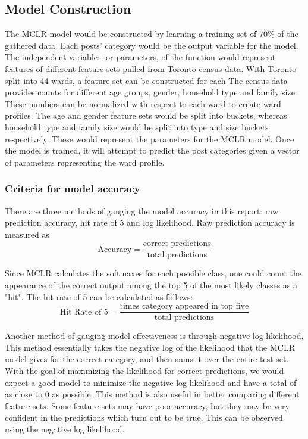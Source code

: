 \documentclass[12pt]{article}
\begin{document}
   \subsection{Model Construction}
   The MCLR model would be constructed by learning a training set of 70\% of the gathered data. Each posts' category would be the output variable for the model. The independent variables, or parameters, of the function would represent features of different feature sets pulled from Toronto census data. With Toronto split into 44 wards, a feature set can be constructed for each  The census data provides counts for different age groups, gender, household type and family size. These numbers can be normalized with respect to each ward to create ward profiles. The age and gender feature sets would be split into buckets, whereas household type and family size would be split into type and size buckets respectively. These would represent the parameters for the MCLR model. Once the model is trained, it will attempt to predict the post categories given a vector of parameters representing the ward profile. 

   \subsubsection{Criteria for model accuracy}
   There are three methods of gauging the model accuracy in this report: raw prediction accuracy, hit rate of 5 and log likelihood. Raw prediction accuracy is measured as 
   \[\text{Accuracy} = \frac{\text{correct predictions}}{\text{total predictions}}\]

   Since MCLR calculates the softmaxes for each possible class, one could count the appearance of the correct output among the top 5 of the most likely classes as a "hit". The hit rate of 5 can be calculated as follows:
   \[\text{Hit Rate of 5} = \frac{\text{times category appeared in top five}}{\text{total predictions}}\]

   Another method of gauging model effectiveness is through negative log likelihood. This method essentially takes the negative log of the likelihood that the MCLR model gives for the correct category, and then sums it over the entire test set. With the goal of maximizing the likelihood for correct predictions, we would expect a good model to minimize the negative log likelihood and have a total of as close to 0 as possible. This method is also useful in better comparing different feature sets. Some feature sets may have poor accuracy, but they may be very confident in the predictions which turn out to be true. This can be observed using the negative log likelihood.  
\end{document}
